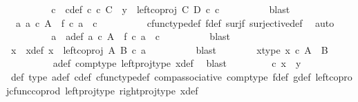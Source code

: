 \begin{isabellebody}
\ \ \ \ \ \ \isamarkupfalse%
\ \isamarkupfalse%
\ c\ \ c{\isacharunderscore}{\kern0pt}def{\isacharcolon}{\kern0pt}\ {\isachardoublequoteopen}c\ {\isasymin}\isactrlsub c\ C\ {\isasymand}\ y\ {\isacharequal}{\kern0pt}\ left{\isacharunderscore}{\kern0pt}coproj\ C\ D\ {\isasymcirc}\isactrlsub c\ c{\isachardoublequoteclose}\isanewline
\ \ \ \ \ \ \ \ \isamarkupfalse%
\ blast\isanewline
\ \ \ \ \ \ \isamarkupfalse%
\ \isamarkupfalse%
\ {\isachardoublequoteopen}{\isasymexists}\ a{\isachardot}{\kern0pt}\ a\ {\isasymin}\isactrlsub c\ A\ {\isasymand}\ f\ {\isasymcirc}\isactrlsub c\ a\ {\isacharequal}{\kern0pt}\ c{\isachardoublequoteclose}\isanewline
\ \ \ \ \ \ \ \ \isamarkupfalse%
\ cfunc{\isacharunderscore}{\kern0pt}type{\isacharunderscore}{\kern0pt}def\ f{\isacharunderscore}{\kern0pt}def\ surj{\isacharunderscore}{\kern0pt}f\ surjective{\isacharunderscore}{\kern0pt}def\ \isamarkupfalse%
\ auto\isanewline
\ \ \ \ \ \ \isamarkupfalse%
\ \isamarkupfalse%
\ a\ \ a{\isacharunderscore}{\kern0pt}def{\isacharcolon}{\kern0pt}\ {\isachardoublequoteopen}a\ {\isasymin}\isactrlsub c\ A\ {\isasymand}\ f\ {\isasymcirc}\isactrlsub c\ a\ {\isacharequal}{\kern0pt}\ c{\isachardoublequoteclose}\isanewline
\ \ \ \ \ \ \ \ \isamarkupfalse%
\ blast\isanewline
\ \ \ \ \ \ \isamarkupfalse%
\ x\ \ x{\isacharunderscore}{\kern0pt}def{\isacharcolon}{\kern0pt}\ {\isachardoublequoteopen}x\ {\isacharequal}{\kern0pt}\ left{\isacharunderscore}{\kern0pt}coproj\ A\ B\ {\isasymcirc}\isactrlsub c\ a{\isachardoublequoteclose}\isanewline
\ \ \ \ \ \ \ \ \isamarkupfalse%
\ blast\isanewline
\ \ \ \ \ \ \isamarkupfalse%
\ x{\isacharunderscore}{\kern0pt}type{\isacharcolon}{\kern0pt}\ {\isachardoublequoteopen}x\ {\isasymin}\isactrlsub c\ A\ {\isasymCoprod}\ B{\isachardoublequoteclose}\isanewline
\ \ \ \ \ \ \ \ \isamarkupfalse%
\ a{\isacharunderscore}{\kern0pt}def\ comp{\isacharunderscore}{\kern0pt}type\ left{\isacharunderscore}{\kern0pt}proj{\isacharunderscore}{\kern0pt}type\ x{\isacharunderscore}{\kern0pt}def\ \isamarkupfalse%
\ blast\isanewline
\ \ \ \ \ \ \isamarkupfalse%
\ {\isachardoublequoteopen}{\isasymphi}\ {\isasymcirc}\isactrlsub c\ x\ {\isacharequal}{\kern0pt}\ y{\isachardoublequoteclose}\isanewline
\ \ \ \ \ \ \ \ \isamarkupfalse%
\ {\isasymphi}{\isacharunderscore}{\kern0pt}def\ {\isasymphi}{\isacharunderscore}{\kern0pt}type\ a{\isacharunderscore}{\kern0pt}def\ c{\isacharunderscore}{\kern0pt}def\ cfunc{\isacharunderscore}{\kern0pt}type{\isacharunderscore}{\kern0pt}def\ comp{\isacharunderscore}{\kern0pt}associative\ comp{\isacharunderscore}{\kern0pt}type\ f{\isacharunderscore}{\kern0pt}def\ g{\isacharunderscore}{\kern0pt}def\ left{\isacharunderscore}{\kern0pt}coproj{\isacharunderscore}{\kern0pt}cfunc{\isacharunderscore}{\kern0pt}coprod\ left{\isacharunderscore}{\kern0pt}proj{\isacharunderscore}{\kern0pt}type\ right{\isacharunderscore}{\kern0pt}proj{\isacharunderscore}{\kern0pt}type\ x{\isacharunderscore}{\kern0pt}def\ \isamarkupfalse%

\end{isabellebody}
